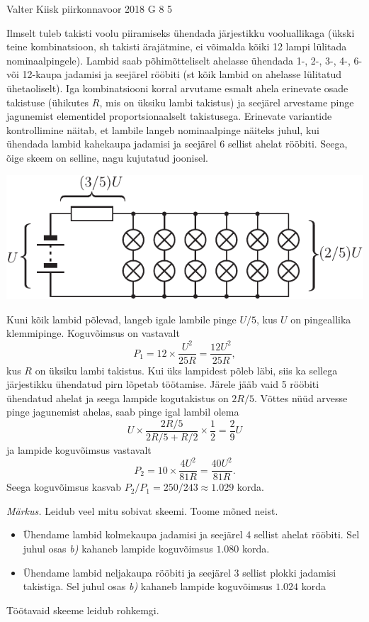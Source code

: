 \documentclass[11pt]{article}
\begin{document}
{%
{Valter Kiisk} %
{piirkonnavoor} %
{2018} %
{G 8} %
{5} %
{

\ifSolution
\osa Ilmselt tuleb takisti voolu piiramiseks ühendada järjestikku vooluallikaga (ükski teine kombinatsioon, sh takisti ärajätmine, ei võimalda kõiki 12 lampi lülitada nominaalpingele). Lambid saab põhimõtteliselt ahelasse ühendada 1-, 2-, 3-, 4-, 6- või 12-kaupa jadamisi ja seejärel rööbiti (st kõik lambid on ahelasse lülitatud ühetaoliselt). Iga kombinatsiooni korral arvutame esmalt ahela erinevate osade takistuse (ühikutes $R$, mis on üksiku lambi takistus) ja seejärel arvestame pinge jagunemist elementidel proportsionaalselt takistusega. Erinevate variantide kontrollimine näitab, et lambile langeb nominaalpinge näiteks juhul, kui ühendada lambid kahekaupa jadamisi ja seejärel 6 sellist ahelat rööbiti. Seega, õige skeem on selline, nagu kujutatud joonisel.

\begin{center}
\includegraphics{2018-v2g-08-lambid-joonis.pdf}
\end{center}

Kuni kõik lambid põlevad, langeb igale lambile pinge $U/5$, kus $U$ on pingeallika klemmipinge. Koguvõimsus on vastavalt
\[
P_1=12\times \frac{U^2}{25R}=\frac{12U^2}{25R},
\]
kus $R$ on üksiku lambi takistus. Kui üks lampidest põleb läbi, siis ka sellega järjestikku ühendatud pirn lõpetab töötamise. Järele jääb vaid 5 rööbiti ühendatud ahelat ja seega lampide kogutakistus on $2R/5$. Võttes nüüd arvesse pinge jagunemist ahelas, saab pinge igal lambil olema
\[
U\times \frac{2R/5}{2R/5+R/2} \times \frac{1}{2}=\frac{2}{9}U
\]
ja lampide koguvõimsus vastavalt
\[
P_2=10\times \frac{4U^2}{81R}=\frac{40U^2}{81R}.
\]
Seega koguvõimsus kasvab $P_2/P_1=250/243\approx \num{1.029}$ korda.

\textit{Märkus.} Leidub veel mitu sobivat skeemi. Toome mõned neist.
\begin{itemize} 
\item
Ühendame lambid kolmekaupa jadamisi ja seejärel 4 sellist ahelat rööbiti. Sel juhul osas \textit{b)} kahaneb lampide koguvõimsus $\num{1.080}$ korda.
\item
Ühendame lambid neljakaupa rööbiti ja seejärel 3 sellist plokki jadamisi takistiga. Sel juhul osas \textit{b)} kahaneb lampide koguvõimsus $\num{1.024}$ korda
\end{itemize}
Töötavaid skeeme leidub rohkemgi.
\fi
}

}
\end{document}
